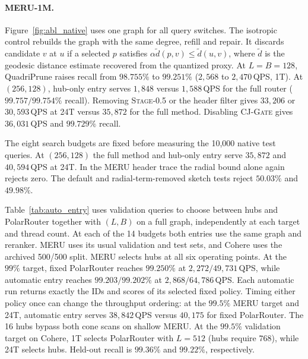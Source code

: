 \paragraph{MERU-1M.}
Figure~\ref{fig:abl_native} uses one graph for all query switches. The isotropic control rebuilds the graph with the same degree, refill and repair. It discards candidate $v$ at $u$ if a selected $p$ satisfies $\alpha\tilde d(p,v)\le\tilde d(u,v)$, where $\tilde d$ is the geodesic distance estimate recovered from the quantized proxy. At $L=B=128$, QuadriPrune raises recall from $98.755\%$ to $99.251\%$ ($2{,}568$ to $2{,}470$\,QPS, 1T). At $(256,128)$, hub-only entry serves $1{,}848$ versus $1{,}588$\,QPS for the full router ($99.757/99.754\%$ recall). Removing \textsc{Stage-0.5} or the header filter gives $33{,}206$ or $30{,}593$\,QPS at 24T versus $35{,}872$ for the full method. Disabling \textsc{CJ-Gate} gives $36{,}031$\,QPS and $99.729\%$ recall.

The eight search budgets are fixed before measuring the 10,000 native test queries. At $(256,128)$ the full method and hub-only entry serve $35{,}872$ and $40{,}594$\,QPS at 24T. In the MERU header trace the radial bound alone again rejects zero. The default and radial-term-removed sketch tests reject $50.03\%$ and $49.98\%$.

Table~\ref{tab:auto_entry} uses validation queries to choose between hubs and PolarRouter together with $(L,B)$ on a full graph, independently at each target and thread count. At each of the 14 budgets both entries use the same graph and reranker. MERU uses its usual validation and test sets, and Cohere uses the archived 500/500 split. MERU selects hubs at all six operating points. At the $99\%$ target, fixed PolarRouter reaches $99.250\%$ at $2{,}272/49{,}731$\,QPS, while automatic entry reaches $99.203/99.202\%$ at $2{,}868/64{,}786$\,QPS. Each automatic run returns exactly the IDs and scores of its selected fixed policy. Timing either policy once can change the throughput ordering: at the $99.5\%$ MERU target and 24T, automatic entry serves $38{,}842$\,QPS versus $40{,}175$ for fixed PolarRouter. The 16 hubs bypass both cone scans on shallow MERU. At the $99.5\%$ validation target on Cohere, 1T selects PolarRouter with $L=512$ (hubs require $768$), while 24T selects hubs. Held-out recall is $99.36\%$ and $99.22\%$, respectively.



